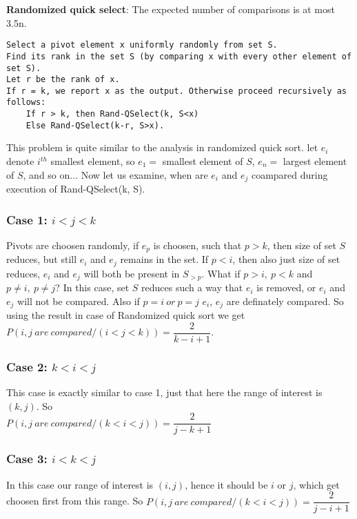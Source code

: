 \documentclass[a4paper]{article}
\begin{document}
\begin{question}
\textbf{Randomized quick select}: The expected number of comparisons is at most 3.5n.
\end{question}
\begin{file}
\begin{lstlisting}[columns=fullflexible]
Select a pivot element x uniformly randomly from set S.
Find its rank in the set S (by comparing x with every other element of set S).
Let r be the rank of x.
If r = k, we report x as the output. Otherwise proceed recursively as follows:
    If r > k, then Rand-QSelect(k, S<x)
    Else Rand-QSelect(k-r, S>x).
\end{lstlisting}
\end{file}

This problem is quite similar to the analysis in randomized quick sort. let $e_i$ denote $i^{th}$
smallest element, so $e_1 = $ smallest element of $S$, $e_n = $ largest element of $S$, and so on...
Now let us examine, when are $e_i$ and $e_j$ coampared during execution of Rand-QSelect(k, S).

\subsubsection*{Case 1: $i < j < k$}
Pivots are choosen randomly, if $e_p$ is choosen, such that $p > k$, then size of set $S$ reduces, but still
$e_i$ and $e_j$ remains in the set. If $p < i$, then also just size of set reduces, $e_i$ and $e_j$
will both be present in $S_{>p}$. What if $p > i,\ p < k$ and $p \neq i,\ p \neq j$? In this case, set 
$S$ reduces such a way that $e_i$ is removed, or $e_i$ and $e_j$ will not be compared. Also if 
$p = i\ or\ p = j$ $e_i$, $e_j$ are definately compared. So using the result in case of Randomized quick sort we
get $P(i,j \ are\ compared / (i < j < k)) = \dfrac{2}{k - i + 1}$.


\subsubsection*{Case 2: $k < i < j$}
This case is exactly similar to case 1, just that here the range of interest is $(k, j)$. So \\
$P(i,j \ are\ compared / (k < i < j)) = \dfrac{2}{j - k + 1}$

\subsubsection*{Case 3: $i < k < j$}
In this case our range of interest is $(i, j)$, hence it should be $i$ or $j$, which get choosen first from this range.
So $P(i,j \ are\ compared / (k < i < j)) = \dfrac{2}{j - i + 1}$
\end{document}
